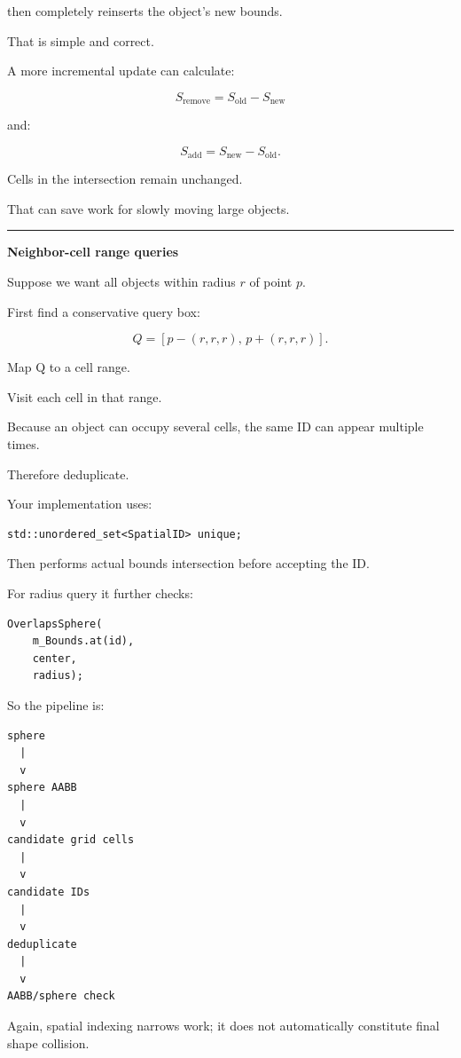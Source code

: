 then completely reinserts the object's new bounds.

That is simple and correct.

A more incremental update can calculate:

\[
S_{\text{remove}}
=
S_{\text{old}}-S_{\text{new}}
\]

and:

\[
S_{\text{add}}
=
S_{\text{new}}-S_{\text{old}}.
\]

Cells in the intersection remain unchanged.

That can save work for slowly moving large objects.

\begin{center}\rule{0.5\linewidth}{0.5pt}\end{center}

\textbf{Neighbor-cell range queries}

Suppose we want all objects within radius \(r\) of point \(p\).

First find a conservative query box:

\[
Q=
[p-(r,r,r),\,
 p+(r,r,r)].
\]

Map Q to a cell range.

Visit each cell in that range.

Because an object can occupy several cells, the same ID can appear multiple times.

Therefore deduplicate.

Your implementation uses:

\begin{verbatim}
std::unordered_set<SpatialID> unique;
\end{verbatim}

Then performs actual bounds intersection before accepting the ID.

For radius query it further checks:

\begin{verbatim}
OverlapsSphere(
    m_Bounds.at(id),
    center,
    radius);
\end{verbatim}

So the pipeline is:

\begin{verbatim}
sphere
  |
  v
sphere AABB
  |
  v
candidate grid cells
  |
  v
candidate IDs
  |
  v
deduplicate
  |
  v
AABB/sphere check
\end{verbatim}

Again, spatial indexing narrows work; it does not automatically constitute final shape collision.

